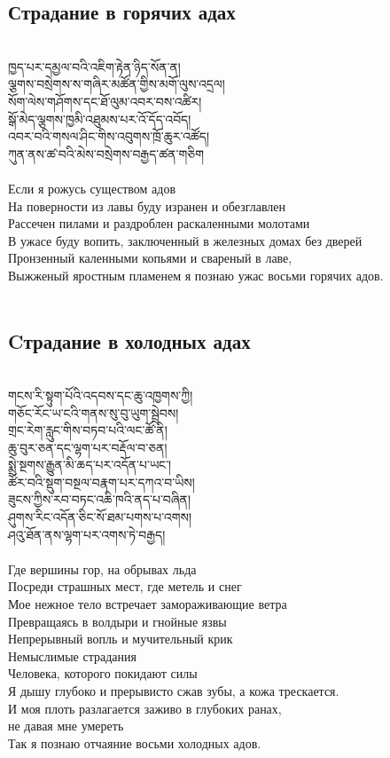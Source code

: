 \subsection*{Страдание в горячих адах}
\\
\ti
ཁྱད་པར་དམྱལ་བའི་འཇིག་རྟེན་ཉིད་སོན་ན།\\
ལྕགས་བསྲེགས་ས་གཞིར་མཚོན་གྱིས་མགོ་ལུས་འདྲལ།\\
སོག་ལེས་གཤོགས་དང་ཐོ་ལུམ་འབར་བས་འཚིར།\\
སྒོ་མེད་ལྕགས་ཁྱམི་འཐུམས་པར་འོ་དོད་འབོད།\\
འབར་བའི་གསལ་ཤིང་གིས་འབུགས་ཁྲོ་ཆུར་འཚོད།\\
ཀུན་ནས་ཚ་བའི་མེས་བསྲེགས་བརྒྱད་ཚན་གཅིག\\
\\
\ru
Если я рожусь существом адов\\
На поверности из лавы буду изранен и обезглавлен\\
Рассечен пилами и раздроблен раскаленными молотами\\
В ужасе буду вопить, заключенный в железных домах без дверей\\
Пронзенный каленными копьями и свареный в лаве,\\
Выжженый яростным пламенем я познаю ужас восьми горячих адов.\\
\\
\newpage
\subsection*{Cтрадание в холодных адах}
\\
\ti
གངས་རི་སྟུག་པོའི་འདབས་དང་ཆུ་འཁྱགས་ཀྱི། \\
གཅོང་རོང་ཡ་ངའི་གནས་སུ་བུ་ཡུག་སྦྲེབས། \\
གྲང་རེག་རླུང་གིས་བཏབ་པའི་ལང་ཚོ་ནི། \\
ཆུ་བུར་ཅན་དང་ལྷག་པར་བརྡོལ་བ་ཅན། \\
སྨྲེ་སྔགས་རྒྱུན་མི་ཆད་པར་འདོན་པ་ཡང་། \\
ཚོར་བའི་སྡུག་བསྔལ་བརྣག་པར་དཀའ་བ་ཡིས།\\
ཟུངས་ཀྱིས་རབ་བཏང་འཆི་ཁའི་ནད་པ་བཞིན།\\
ཤུགས་རིང་འདོན་ཅིང་སོ་ཐམ་པགས་པ་འགས། \\
ཤའུ་ཐོན་ནས་ལྷག་པར་འགས་ཏེ་བརྒྱད།\\
\\
\ru
Где вершины гор, на обрывах льда\\
Посреди страшных мест, где метель и снег\\
Мое нежное тело встречает замораживающие ветра\\
Превращаясь в волдыри и гнойные язвы\\
Непрерывный вопль и мучительный крик\\
Немыслимые страдания\\
Человека, которого покидают силы\\
Я дышу глубоко и прерывисто сжав зубы, а кожа трескается.\\
И моя плоть разлагается заживо в глубоких ранах,\\
не давая мне умереть\\
Так я познаю отчаяние восьми холодных адов.\\

